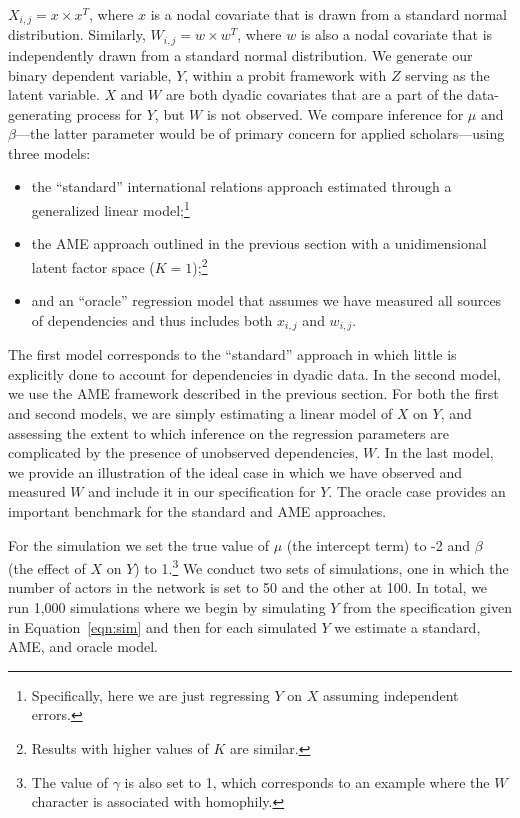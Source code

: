 $X_{i,j} = x \times x^{T}$, where $x$ is a nodal covariate that is drawn from a standard normal distribution. Similarly,  $W_{i,j} = w \times w^{T}$, where $w$ is also a nodal covariate that is independently drawn from a standard normal distribution. We generate our binary dependent variable, $Y$, within a probit framework with $Z$ serving as the latent variable. $X$ and $W$ are both dyadic covariates that are a part of the data-generating process for $Y$, but $W$ is not observed. We compare inference for $\mu$ and $\beta$---the latter parameter would be of primary concern for applied scholars---using three models:

\begin{itemize}
	\item the ``standard'' international relations approach estimated through a generalized linear model;\footnote{Specifically, here we are just regressing $Y$ on $X$ assuming independent errors.}
	\item the AME approach outlined in the previous section with a unidimensional latent factor space ($K=1$);\footnote{Results with higher values of $K$ are similar.}
	\item and an ``oracle'' regression model that assumes we have measured all sources of dependencies and thus includes both $x_{i,j}$ and $w_{i,j}$.
\end{itemize}

The first model corresponds to the ``standard'' approach in which little is explicitly done to account for dependencies in dyadic data. In the second model, we use the AME framework described in the previous section. For both the first and second models, we are simply estimating a linear model of $X$ on $Y$, and assessing the extent to which inference on the regression parameters are complicated by the presence of unobserved dependencies, $W$. In the last model, we provide an illustration of the ideal case in which we have observed and measured $W$ and include it in our specification for $Y$. The oracle case provides an important benchmark for the standard and AME approaches.

For the simulation we set the true value of $\mu$ (the intercept term) to -2 and $\beta$ (the effect of $X$ on $Y$) to 1.\footnote{The value of $\gamma$ is also set to 1, which corresponds to an example where the $W$ character is associated with homophily.} We conduct two sets of simulations, one in which the number of actors in the network is set to 50 and the other at 100. In total, we run 1,000 simulations where we begin by simulating $Y$ from the specification given in Equation~\ref{eqn:sim} and then for each simulated $Y$ we estimate a standard, AME, and oracle model.

